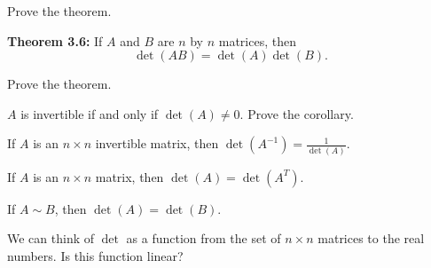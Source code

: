 \begin{enumerate}
\newpage

\Problem Prove the theorem.

\newpage

{\bf Theorem 3.6:} If $A$ and $B$ are $n$ by $n$ matrices, then $$\operatorname{det}(AB)=\operatorname{det}(A)\operatorname{det}(B).$$

\Problem Prove the theorem.

\vfill
\vfill

 $A$ is invertible if and only if $\operatorname{det}(A)\neq0$. Prove the corollary.

\vfill

\newpage


\Part If $A$ is an $n\times n$ invertible matrix, then $\operatorname{det}(A^{-1})=\frac{1}{\operatorname{det}(A)}$.

\vfill

\Part If $A$ is an $n\times n$ matrix, then $\operatorname{det}(A)=\operatorname{det}(A^{T})$.

\vfill

\Part If $A \sim B$, then $\operatorname{det}(A)=\operatorname{det}(B)$.

\vfill

\Problem We can think of $\operatorname{det}$ as a function from the set of $n\times n$ matrices to the real numbers. Is this function linear?

\vfill




\end{enumerate}


